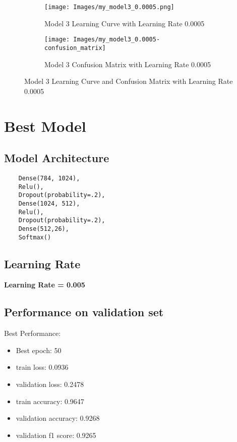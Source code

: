 \documentclass{article}
\begin{document}
\begin{figure}[h]
    \begin{subfigure}{0.5\textwidth}
        \texttt{[image: Images/my\_model3\_0.0005.png]} 
        \caption{Model 3 Learning Curve with Learning Rate 0.0005}
        \label{fig:model3_lr_0.0005}
    \end{subfigure}
    \begin{subfigure}{0.5\textwidth}
        \texttt{[image: Images/my\_model3\_0.0005-confusion\_matrix]} 
        \caption{Model 3 Confusion Matrix with Learning Rate 0.0005}
        \label{fig:model3_lr_0.0005_confusion_matrix}
    \end{subfigure}
    \caption{Model 3 Learning Curve and Confusion Matrix with Learning Rate 0.0005}
    \label{fig:model3_lr_0.0005_combined}
\end{figure}

\section{Best Model}
\subsection{Model Architecture}
\begin{verbatim}
    Dense(784, 1024),
    Relu(),
    Dropout(probability=.2),
    Dense(1024, 512),
    Relu(),
    Dropout(probability=.2),
    Dense(512,26),
    Softmax()
\end{verbatim}
\subsection{Learning Rate}
\textbf{Learning Rate = 0.005}
\subsection{Performance on validation set}
Best Performance:
\begin{itemize}
    \item Best epoch: 50
    \item train loss: 0.0936
    \item validation loss: 0.2478
    \item train accuracy: 0.9647
    \item validation accuracy: 0.9268
    \item validation f1 score: 0.9265
\end{itemize}
\end{document}
